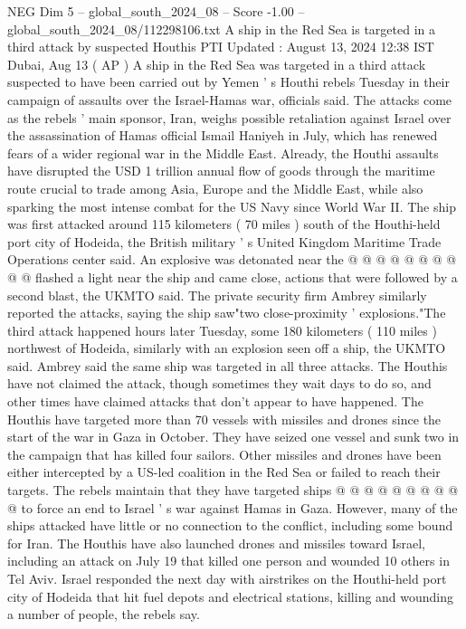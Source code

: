 \begin{textsample}{NEG Dim 5 – global\_south\_2024\_08 – Score -1.00 – global\_south\_2024\_08/112298106.txt}  \label{ex:f5_neg_174}
A ship in the Red Sea is targeted in a third attack by suspected Houthis PTI Updated : August 13, 2024 12:38 IST Dubai, Aug 13 ( AP ) A ship in the Red Sea was targeted in a third attack suspected to have been carried out by Yemen ' s Houthi rebels Tuesday in their campaign of assaults over the Israel-Hamas war, officials said.
The attacks come as the rebels ' main sponsor, Iran, weighs possible retaliation against Israel over the assassination of Hamas official Ismail Haniyeh in July, which has renewed fears of a wider regional war in the Middle East.
Already, the Houthi assaults have disrupted the USD 1 trillion annual flow of goods through the maritime route crucial to trade among Asia, Europe and the Middle East, while also sparking the most intense combat for the US Navy since World War II.
The ship was first attacked around 115 kilometers ( 70 miles ) south of the Houthi-held port city of Hodeida, the British military ' s United Kingdom Maritime Trade Operations center said.
An explosive was detonated near the @ @ @ @ @ @ @ @ @ @ flashed a light near the ship and came close, actions that were followed by a second blast, the UKMTO said.
The private security firm Ambrey similarly reported the attacks, saying the ship saw"two close-proximity ' explosions."The third attack happened hours later Tuesday, some 180 kilometers ( 110 miles ) northwest of Hodeida, similarly with an explosion seen off a ship, the UKMTO said.
Ambrey said the same ship was targeted in all three attacks.
The Houthis have not claimed the attack, though sometimes they wait days to do so, and other times have claimed attacks that don't appear to have happened.
The Houthis have targeted more than 70 vessels with missiles and drones since the start of the war in Gaza in October.
They have seized one vessel and sunk two in the campaign that has killed four sailors.
Other missiles and drones have been either intercepted by a US-led coalition in the Red Sea or failed to reach their targets.
The rebels maintain that they have targeted ships @ @ @ @ @ @ @ @ @ @ to force an end to Israel ' s war against Hamas in Gaza.
However, many of the ships attacked have little or no connection to the conflict, including some bound for Iran.
The Houthis have also launched drones and missiles toward Israel, including an attack on July 19 that killed one person and wounded 10 others in Tel Aviv.
Israel responded the next day with airstrikes on the Houthi-held port city of Hodeida that hit fuel depots and electrical stations, killing and wounding a number of people, the rebels say.

\end{textsample}
